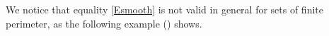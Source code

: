 %
%
%
%




We notice that equality \eqref{Esmooth} is not valid in general for sets of finite perimeter, as the following example (\cite[Example 1.10]{giusti1984minimal}) shows. 


